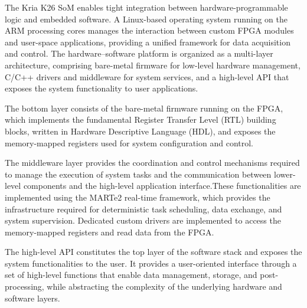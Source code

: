 The Kria K26 SoM enables tight integration between hardware-programmable logic and embedded software. A Linux-based operating system running on the ARM processing cores manages the interaction between custom FPGA modules and user-space applications, providing a unified framework for data acquisition and control. The hardware–software platform is organized as a multi-layer architecture, comprising bare-metal firmware for low-level hardware management, C/C++ drivers and middleware for system services, and a high-level API that exposes the system functionality to user applications.

The bottom layer consists of the bare-metal firmware running on the FPGA, which implements the fundamental Register Transfer Level (RTL) building blocks, written in Hardware Descriptive Language (HDL), and exposes the memory-mapped registers used for system configuration and control.

The middleware layer provides the coordination and control mechanisms required to manage the execution of system tasks and the communication between lower-level components and the high-level application interface.These functionalities are implemented using the MARTe2 real-time framework, which provides the infrastructure required for deterministic task scheduling, data exchange, and system supervision. Dedicated custom drivers are implemented to access the memory-mapped registers and read data from the FPGA. 

The high-level API constitutes the top layer of the software stack and exposes the system functionalities to the user. It provides a user-oriented interface through a set of high-level functions that enable data management, storage, and post-processing, while abstracting the complexity of the underlying hardware and software layers.



